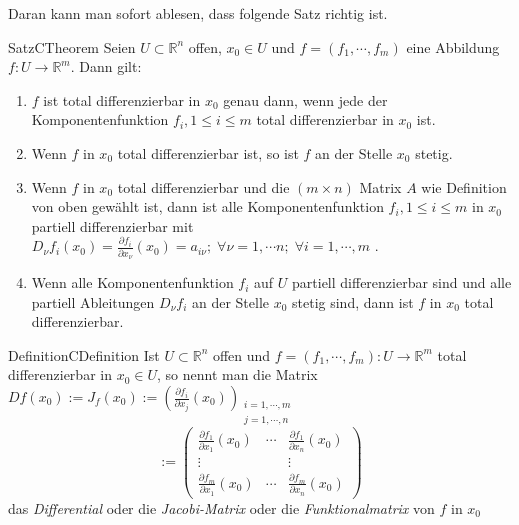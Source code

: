 
%

%
Daran kann man sofort ablesen, dass folgende Satz richtig ist.
	\begin{ibox}[32]{Satz}{CTheorem}
	   Seien $ U \subset \mathbb{R}^n $  offen, $ x_0 \in U $ und $ f = \left( f_1, \cdots, f_{m} \right)  $  
	   eine Abbildung $ f:U \to \mathbb{R}^m $. Dann gilt:
	   \begin{enumerate}[label=\alph*)]
	   	\item $ f $ ist total differenzierbar in $ x_0 $ genau dann, wenn jede der Komponentenfunktion $ f_{i}, 1 \leq i \leq m	 $
			total differenzierbar in $ x_0 $ ist.
		\item Wenn $ f $ in $ x_0 $ total differenzierbar ist, so ist $ f $ an der Stelle $ x_0 $ stetig.
		\item Wenn $ f $ in $ x_0 $ total differenzierbar und die $ \left( m \times n \right)  $ Matrix $ A $ wie Definition
			von oben gewählt ist, dann ist alle Komponentenfunktion $f_{i}, 1 \leq i \leq m$ in $x_0 $ partiell differenzierbar
			mit $ D_{\nu} f_{i}(x_0) = \frac{\partial f_{i}}{\partial x_{\nu}} (x_0) = a_{i \nu}; \; \forall \nu = 1, \cdots n 
			; \; \forall  i = 1, \cdots, m$ . 
		\item Wenn alle Komponentenfunktion $ f_{i} $ auf $ U $ partiell differenzierbar sind und alle partiell Ableitungen
			$ D_{\nu}f_{i} $ an der Stelle $ x_0 $ stetig sind, dann ist $ f $ in $ x_0 $ total differenzierbar.
	   \end{enumerate}
	\end{ibox}
	 
	\begin{ibox}[]{Definition}{CDefinition}
	    Ist $ U \subset  \mathbb{R}^n  $ offen und $ f = \left( f_1, \cdots, f_{m} \right) : U \to \mathbb{R}^m $ total 
		differenzierbar in $ x_0 \in  U $, so nennt man die Matrix $ Df(x_0) := J_{f}(x_0) := 
		\left( \frac{\partial f_{i}}{\partial x_{j}} (x_0) \right)_{\substack{i = 1 , \cdots, m \\ j = 1, \cdots, n}}  $
		$$ := \begin{pmatrix}
			\frac{\partial f_1}{\partial x_1} (x_0) & \cdots & \frac{\partial f_1}{\partial x_{n}} (x_{0}) \\
			\vdots & &\vdots\\
			\frac{\partial f_{m}}{\partial x_{1}} (x_0) & \cdots & \frac{\partial f_{m}}{\partial x_{n}} (x_0)
		\end{pmatrix}
		 $$
	das \textit{Differential} oder die \textit{Jacobi-Matrix } oder die \textit{Funktionalmatrix } von $ f  $ in $ x_0 $  	
	\end{ibox}
	
